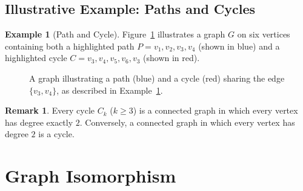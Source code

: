 \documentclass[12pt,a4paper]{article}
\theoremstyle{definition}
\newtheorem{example}{Example}[section]
\newtheorem{remark}{Remark}[section]
\theoremstyle{plain}
\begin{document}
\subsection{Illustrative Example: Paths and Cycles}

\begin{example}[Path and Cycle]\label{ex:path-cycle}
  Figure~\ref{fig:path-cycle} illustrates a graph \(G\) on six vertices
  containing both a highlighted path \(P = v_1, v_2, v_3, v_4\) (shown in
  blue) and a highlighted cycle \(C = v_3, v_4, v_5, v_6, v_3\) (shown in
  red).
\end{example}

\begin{figure}[htbp]
  \centering
  \caption{A graph illustrating a path (blue) and a cycle (red) sharing
           the edge \(\{v_3,v_4\}\), as described in
           Example~\ref{ex:path-cycle}.}
  \label{fig:path-cycle}
\end{figure}

\begin{remark}\label{rem:path-cycle}
  Every cycle \(C_k\) (\(k \ge 3\)) is a connected graph in which every
  vertex has degree exactly \(2\).  Conversely, a connected graph in which
  every vertex has degree \(2\) is a cycle.
\end{remark}

\section{Graph Isomorphism}
\label{sec:isomorphism}
\end{document}
